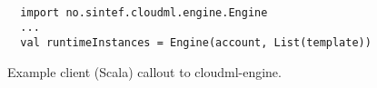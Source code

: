 \begin{figure}
  \begin{center}
    \begin{verbatim}

  import no.sintef.cloudml.engine.Engine
  ...
  val runtimeInstances = Engine(account, List(template))
    \end{verbatim}
  \end{center}
  \caption{Example client (Scala) callout to cloudml-engine.}
  \label{fig:cloudml-engine-usage}
\end{figure}

